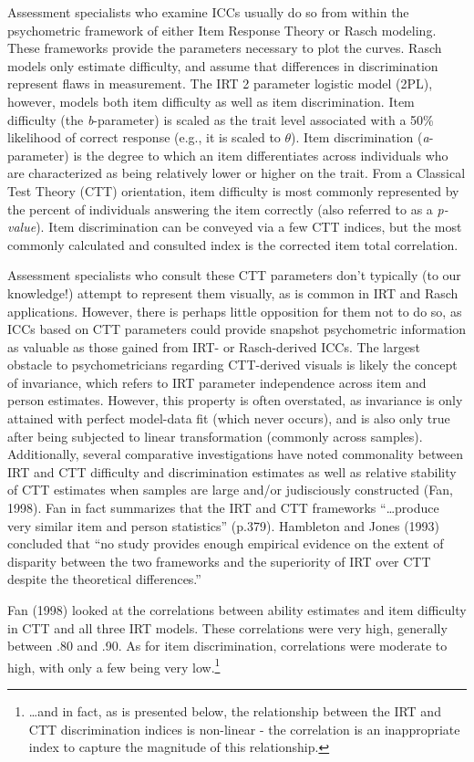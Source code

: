 \documentclass[
  english,
  man]{apa6}
\begin{document}
Assessment specialists who examine ICCs usually do so from within the psychometric framework of either Item Response Theory or Rasch modeling. These frameworks provide the parameters necessary to plot the curves. Rasch models only estimate difficulty, and assume that differences in discrimination represent flaws in measurement. The IRT 2 parameter logistic model (2PL), however, models both item difficulty as well as item discrimination. Item difficulty (the \emph{b}-parameter) is scaled as the trait level associated with a 50\% likelihood of correct response (e.g., it is scaled to \(\theta\)). Item discrimination (\emph{a}-parameter) is the degree to which an item differentiates across individuals who are characterized as being relatively lower or higher on the trait. From a Classical Test Theory (CTT) orientation, item difficulty is most commonly represented by the percent of individuals answering the item correctly (also referred to as a \emph{p-value}). Item discrimination can be conveyed via a few CTT indices, but the most commonly calculated and consulted index is the corrected item total correlation.

Assessment specialists who consult these CTT parameters don't typically (to our knowledge!) attempt to represent them visually, as is common in IRT and Rasch applications. However, there is perhaps little opposition for them not to do so, as ICCs based on CTT parameters could provide snapshot psychometric information as valuable as those gained from IRT- or Rasch-derived ICCs. The largest obstacle to psychometricians regarding CTT-derived visuals is likely the concept of invariance, which refers to IRT parameter independence across item and person estimates. However, this property is often overstated, as invariance is only attained with perfect model-data fit (which never occurs), and is also only true after being subjected to linear transformation (commonly across samples). Additionally, several comparative investigations have noted commonality between IRT and CTT difficulty and discrimination estimates as well as relative stability of CTT estimates when samples are large and/or judisciously constructed (Fan, 1998). Fan in fact summarizes that the IRT and CTT frameworks ``\ldots produce very similar item and person statistics'' (p.379). Hambleton and Jones (1993) concluded that ``no study provides enough empirical evidence on the extent of disparity between the two frameworks and the superiority of IRT over CTT despite the theoretical differences.''

Fan (1998) looked at the correlations between ability estimates and item difficulty in CTT and all three IRT models. These correlations were very high, generally between .80 and .90. As for item discrimination, correlations were moderate to high, with only a few being very low.\footnote{\ldots and in fact, as is presented below, the relationship between the IRT and CTT discrimination indices is non-linear - the correlation is an inappropriate index to capture the magnitude of this relationship.}
\end{document}
